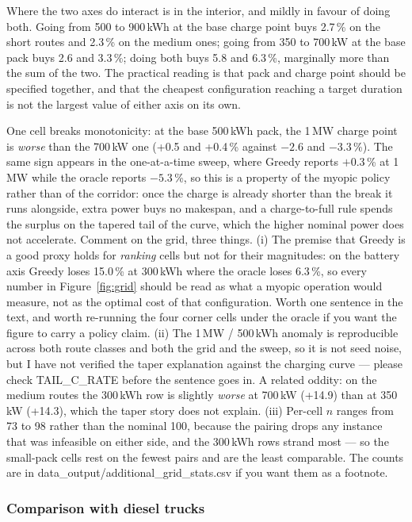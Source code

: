 \documentclass[preprint,12pt,3p]{elsarticle}
\newcommand{\green}[1]{{\color{darkgreen}#1}}
\begin{document}
Where the two axes do interact is in the interior, and mildly in favour of doing both.
Going from 500 to 900\,kWh at the base charge point buys 2.7\,\% on the short routes and
2.3\,\% on the medium ones; going from 350 to 700\,kW at the base pack buys 2.6 and
3.3\,\%; doing both buys 5.8 and 6.3\,\%, marginally more than the sum of the two. The
practical reading is that pack and charge point should be specified together, and that
the cheapest configuration reaching a target duration is not the largest value of
either axis on its own.

One cell breaks monotonicity: at the base 500\,kWh pack, the 1\,MW charge point is
\emph{worse} than the 700\,kW one (+0.5 and +0.4\,\% against $-2.6$ and $-3.3$\,\%). The same
sign appears in the one-at-a-time sweep, where Greedy reports $+0.3$\,\% at 1\,MW while
the oracle reports $-5.3$\,\%, so this is a property of the myopic policy rather than of
the corridor: once the charge is already shorter than the break it runs alongside,
extra power buys no makespan, and a charge-to-full rule spends the surplus on the
tapered tail of the curve, which the higher nominal power does not accelerate.
\green{Comment on the grid, three things. (i) The premise that Greedy is a good proxy
holds for \emph{ranking} cells but not for their magnitudes: on the battery axis Greedy
loses 15.0\,\% at 300\,kWh where the oracle loses 6.3\,\%, so every number in
Figure~\ref{fig:grid} should be read as what a myopic operation would measure, not as
the optimal cost of that configuration. Worth one sentence in the text, and worth
re-running the four corner cells under the oracle if you want the figure to carry a
policy claim. (ii) The 1\,MW / 500\,kWh anomaly is reproducible across both route
classes and both the grid and the sweep, so it is not seed noise, but I have not
verified the taper explanation against the charging curve --- please check
TAIL\_C\_RATE before the sentence goes in. A related oddity: on the medium routes the
300\,kWh row is slightly \emph{worse} at 700\,kW (+14.9) than at 350\,kW (+14.3), which the
taper story does not explain. (iii) Per-cell $n$ ranges from 73 to 98 rather than the
nominal 100, because the pairing drops any instance that was infeasible on either
side, and the 300\,kWh rows strand most --- so the small-pack cells rest on the fewest
pairs and are the least comparable. The counts are in
data\_output/additional\_grid\_stats.csv if you want them as a footnote.}


\subsubsection{Comparison with diesel trucks}
\label{sec:diesel}
\end{document}
